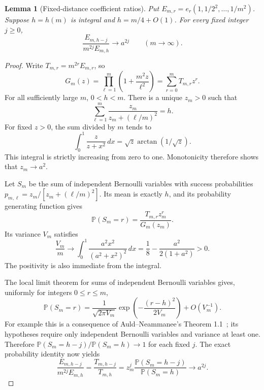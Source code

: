 \documentclass[11pt,a4paper]{article}
\numberwithin{equation}{section}
\newtheorem{lemma}[theorem]{Lemma}
\begin{document}
\begin{lemma}[Fixed-distance coefficient ratios]\label{aud:ap:lem:k0-ratio}
Put $E_{m,r}=e_r(1,1/2^2,\ldots,1/m^2)$. Suppose $h=h(m)$ is integral and $h=m/4+O(1)$. For every fixed integer $j\ge0$,
\[
 \frac{E_{m,h-j}}{m^{2j}E_{m,h}}\longrightarrow a^{2j}
 \qquad(m\to\infty).
\]
\end{lemma}
\begin{proof}
Write $T_{m,r}=m^{2r}E_{m,r}$, so
\[
 G_m(z)=\prod_{\ell=1}^m\left(1+\frac{m^2z}{\ell^2}\right)
       =\sum_{r=0}^m T_{m,r}z^r.
\]
For all sufficiently large $m$, $0<h<m$. There is a unique $z_m>0$ such that
\[
 \sum_{\ell=1}^m\frac{z_m}{z_m+(\ell/m)^2}=h.
\]
For fixed $z>0$, the sum divided by $m$ tends to
\[
 \int_0^1\frac{z}{z+x^2}\,dx
 =\sqrt z\arctan(1/\sqrt z).
\]
This integral is strictly increasing from zero to one. Monotonicity therefore shows that $z_m\to a^2$.

Let $S_m$ be the sum of independent Bernoulli variables with success probabilities
$p_{m,\ell}=z_m/[z_m+(\ell/m)^2]$. Its mean is exactly $h$, and its probability generating function gives
\[
 \mathbb P(S_m=r)=\frac{T_{m,r}z_m^r}{G_m(z_m)}.
\]
Its variance $V_m$ satisfies
\[
 \frac{V_m}{m}\longrightarrow
 \int_0^1\frac{a^2x^2}{(a^2+x^2)^2}\,dx
 =\frac18-\frac{a^2}{2(1+a^2)}>0.
\]
The positivity is also immediate from the integral.

The local limit theorem for sums of independent Bernoulli variables gives, uniformly for integers $0\le r\le m$,
\[
 \mathbb P(S_m=r)=\frac{1}{\sqrt{2\pi V_m}}
 \exp\left(-\frac{(r-h)^2}{2V_m}\right)+O(V_m^{-1}).
\]
For example this is a consequence of Auld--Neammanee's Theorem 1.1~\cite{auld-neammanee-2024}; its hypotheses require only independent Bernoulli variables and variance at least one. Therefore
$\mathbb P(S_m=h-j)/\mathbb P(S_m=h)\to1$ for each fixed $j$. The exact probability identity now yields
\[
 \frac{E_{m,h-j}}{m^{2j}E_{m,h}}
 =\frac{T_{m,h-j}}{T_{m,h}}
 =z_m^j\frac{\mathbb P(S_m=h-j)}{\mathbb P(S_m=h)}\longrightarrow a^{2j}.
\]
\end{proof}
\end{document}
